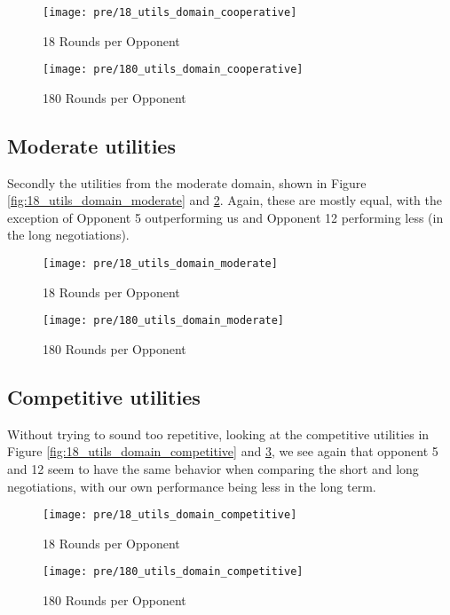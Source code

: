\begin{figure}[H]
	\texttt{[image: pre/18\_utils\_domain\_cooperative]}
	\caption{18 Rounds per Opponent}
	\label{fig:18_utils_domain_cooperative}
	\endminipage\hfill
	\texttt{[image: pre/180\_utils\_domain\_cooperative]}
	\caption{180 Rounds per Opponent}
	\label{fig:180_utils_domain_cooperative}
	\endminipage\hfill
\end{figure}

\subsection{Moderate utilities}

Secondly the utilities from the moderate domain, shown in Figure \ref{fig:18_utils_domain_moderate} and \ref{fig:180_utils_domain_moderate}. Again, these are mostly equal, with the exception of Opponent 5 outperforming us and Opponent 12 performing less (in the long negotiations). 

\begin{figure}[H]
	\texttt{[image: pre/18\_utils\_domain\_moderate]}
	\caption{18 Rounds per Opponent}
	\label{fig:18_utils_domain_moderate}
	\endminipage\hfill
	\texttt{[image: pre/180\_utils\_domain\_moderate]}
	\caption{180 Rounds per Opponent}
	\label{fig:180_utils_domain_moderate}
	\endminipage\hfill
\end{figure}

\subsection{Competitive utilities}

Without trying to sound too repetitive, looking at the competitive utilities in  Figure \ref{fig:18_utils_domain_competitive} and \ref{fig:180_utils_domain_competitive}, we see again that opponent 5 and 12 seem to have the same behavior when comparing the short and long negotiations, with our own performance being less in the long term.

\begin{figure}[H]
	\texttt{[image: pre/18\_utils\_domain\_competitive]}
	\caption{18 Rounds per Opponent}
	\label{fig:18_utils_domain_competitive}
	\endminipage\hfill
	\texttt{[image: pre/180\_utils\_domain\_competitive]}
	\caption{180 Rounds per Opponent}
	\label{fig:180_utils_domain_competitive}
	\endminipage\hfill
\end{figure}